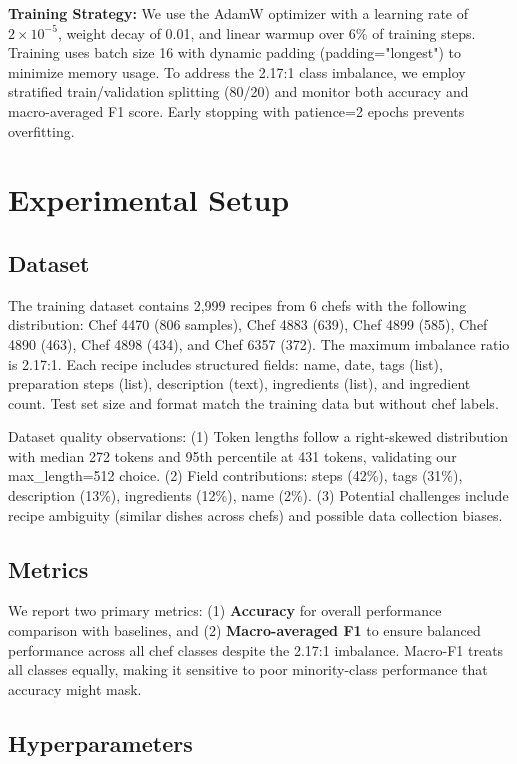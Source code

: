 \documentclass[twocolumn,10pt]{article}
\begin{document}
\textbf{Training Strategy:} We use the AdamW optimizer with a learning rate of $2 \times 10^{-5}$, weight decay of 0.01, and linear warmup over 6\% of training steps. Training uses batch size 16 with dynamic padding (padding="longest") to minimize memory usage. To address the 2.17:1 class imbalance, we employ stratified train/validation splitting (80/20) and monitor both accuracy and macro-averaged F1 score. Early stopping with patience=2 epochs prevents overfitting.

\section{Experimental Setup}
 
\subsection{Dataset}

The training dataset contains 2,999 recipes from 6 chefs with the following distribution: Chef 4470 (806 samples), Chef 4883 (639), Chef 4899 (585), Chef 4890 (463), Chef 4898 (434), and Chef 6357 (372). The maximum imbalance ratio is 2.17:1. Each recipe includes structured fields: name, date, tags (list), preparation steps (list), description (text), ingredients (list), and ingredient count. Test set size and format match the training data but without chef labels.

Dataset quality observations: (1) Token lengths follow a right-skewed distribution with median 272 tokens and 95th percentile at 431 tokens, validating our max\_length=512 choice. (2) Field contributions: steps (42\%), tags (31\%), description (13\%), ingredients (12\%), name (2\%). (3) Potential challenges include recipe ambiguity (similar dishes across chefs) and possible data collection biases.

\subsection{Metrics}

We report two primary metrics: (1) \textbf{Accuracy} for overall performance comparison with baselines, and (2) \textbf{Macro-averaged F1} to ensure balanced performance across all chef classes despite the 2.17:1 imbalance. Macro-F1 treats all classes equally, making it sensitive to poor minority-class performance that accuracy might mask.

\subsection{Hyperparameters}
\end{document}
